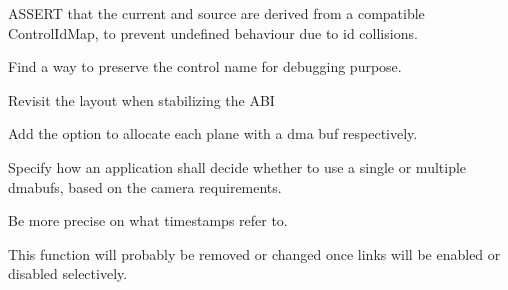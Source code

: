\begin{DoxyRefList}
\label{todo__todo000025}%
%
ASSERT that the current and source  are derived from a compatible Control\+Id\+Map, to prevent undefined behaviour due to id collisions. 
\item[Member \doxylink{classlibcamera_1_1ControlSerializer_aad8c06e31fce42fbd9b0dd7464ad9078}{libcamera\+::Control\+Serializer\+::deserialize} (\doxylink{classlibcamera_1_1ByteStreamBuffer}{Byte\+Stream\+Buffer} \&buffer)]\label{todo__todo000022}%
%
Find a way to preserve the control name for debugging purpose.  
\item[Member \doxylink{classlibcamera_1_1ControlValue_a8121fc11c868a2c6d153982a776914b0}{libcamera\+::Control\+Value\+::Control\+Value} ()]\label{todo__todo000023}%
%
Revisit the  layout when stabilizing the ABI  
\item[Member \doxylink{classlibcamera_1_1DmaBufAllocator_a5e1a0a9ab8d3494e4a73fbabe5cbb07e}{libcamera\+::Dma\+Buf\+Allocator\+::export\+Buffers} (unsigned int count, const std\+::vector$<$ unsigned int $>$ \&plane\+Sizes, std\+::vector\texorpdfstring{$<$}{<} std\+::unique\+\_\+ptr$<$ Frame\+Buffer $>$ \texorpdfstring{$>$}{>} \texorpdfstring{$\ast$}{*}buffers)]\label{todo__todo000026}%
%
Add the option to allocate each plane with a dma buf respectively. 
\item[Struct \doxylink{structlibcamera_1_1FrameBuffer_1_1Plane}{libcamera\+::Frame\+Buffer\+::Plane} ]\label{todo__todo000028}%
%
Specify how an application shall decide whether to use a single or multiple dmabufs, based on the camera requirements.  
\item[Member \doxylink{structlibcamera_1_1FrameMetadata_a08999a7c7b62eeba0a36d352c314bc65}{libcamera\+::Frame\+Metadata\+::timestamp} ]\label{todo__todo000027}%
%
Be more precise on what timestamps refer to.  
\item[Member \doxylink{classlibcamera_1_1ImgUDevice_abab917b2cd40b6c04d008706b41d60c8}{libcamera\+::Img\+UDevice\+::enable\+Links} (bool enable)]\label{todo__todo000038}%
%
This function will probably be removed or changed once links will be enabled or disabled selectively. 
\item[Member \doxylink{classlibcamera_1_1ipa_1_1CameraSensorHelper_ad6d462fc5828e841563289eef22d3174}{libcamera\+::ipa\+::Camera\+Sensor\+Helper\+::black\+Level} () const]\label{todo__todo000007}%

\end{DoxyRefList}
